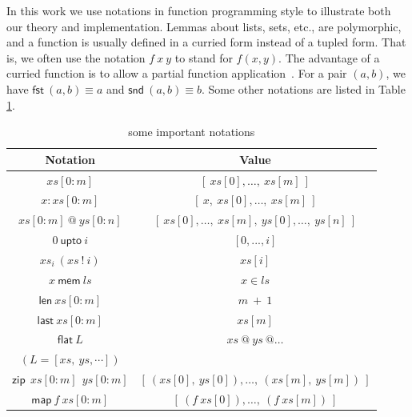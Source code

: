 \documentclass[final]{IEEEtran}
\begin{document}
In this work we use notations in function programming style to
illustrate both our theory and implementation. Lemmas about lists,
sets, etc., are polymorphic, and a function is usually defined in a
curried form instead of a tupled form. That is, we often use the
notation $f~x~y$ to stand for $ f(x,y)$. The advantage of a curried
function is to allow a partial function application~\cite{Pau96}. %
For a pair $(a,b)$, we have $\mathsf{fst\ }(a,b)\equiv a$ and $\mathsf{snd\
}(a,b)\equiv b$. Some other notations are listed in Table \ref{notaions}.
\begin{center}
\begin{table}[tph]
\caption{some important notations}
\label{notaions}
\begin{tabular}{||c|c||}
\hline \hline
Notation & Value\\
\hline \hline
$xs[0:m]$ & $[\ xs[0],\dots,\ xs[m]\ ]$\\
\hline
$x:xs[0:m]$ & $[\ x,\ xs[0],\dots,\ xs[m]\ ]$ \\
\hline
$xs[0:m]\ @\ ys[0:n]$ & $[\ xs[0],\dots,\ xs[m],\ ys[0],\dots,\ ys[n]\ ]$\\
\hline
$0\ \mathsf{upto}\ i$ & $[0,...,i]$\\
\hline
$xs_{i}\ (xs\ !\ i)$ & $xs[i]$\\
\hline
$x\ \mathsf{mem}\ ls$ & $x\in ls$\\
\hline
$ \mathsf{len}~xs[0:m]$ & $m\ +\ 1$\\
\hline
$\mathsf{last}~xs[0:m]$ & $xs[m]$\\
\hline
$\mathsf{flat}\ L$ & $xs\ @\ ys \ @\dots$\\
$(L=[xs,\ ys,\cdots ])$ & \\
\hline
$\mathsf{zip\ }\ xs[0:m]\ \ ys[0:m]$ & $[\ (xs[0],\ ys[0]),\dots,\ (xs[m],\ ys[m])\ ]$\\
\hline
$\mathsf{map\ }f\mathsf{\ }xs[0:m]$ & $[\ (f\ xs[0]),\dots,\ (f\ xs[m])\ ]$\\

\hline \hline
\end{tabular}\\
\end{table}
\end{center}
\end{document}
